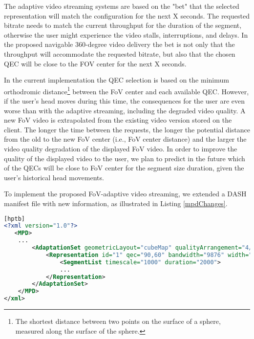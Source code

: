  The adaptive video streaming systems are based on the "bet" that the selected representation will match the configuration for the next X seconds. The requested bitrate needs to match the current throughput for the duration of the segment, otherwise the user might experience the video stalls, interruptions, and delays. In the proposed navigable 360-degree video delivery the bet is not only that the throughput will accommodate the requested bitrate, but also that the chosen QEC will be close to the FOV center for the next X seconds.

 In the current implementation the QEC selection is based on the minimum orthodromic distance\footnote{The shortest distance between two points on the surface of a sphere, measured along the surface of the sphere.} between the FoV center and each available QEC. However, if the user's head moves during this time, the consequences for the user are even worse than with the adaptive streaming, including the degraded video quality. A new FoV video is extrapolated from the existing video version stored on the client. The longer the time between the requests, the longer the potential distance from the old to the new FoV center (i.e., FoV center distance) and the larger the video quality degradation of the displayed FoV video. In order to improve the quality of the displayed video to the user, we plan to predict in the future which of the QECs will be close to FoV center for the segment size duration, given the user's historical head movements.




 To implement the proposed FoV-adaptive video streaming, we extended a DASH manifest file with new information, as illustrated in Listing \ref{mpdChanges}.
\begin{lstlisting}[language=xml, frame=single, backgroundcolor=\color{white}, caption=Extensions of MPD file, label=mpdChanges][hptb]
<?xml version="1.0"?>
   <MPD>
    ...
        <AdaptationSet geometricLayout="cubeMap" qualityArrangement="4/1/1">
            <Representation id="1" qec="90,60" bandwidth="9876" width="1920" height="1080" frameRate="30">
                <SegmentList timescale="1000" duration="2000">
                ...
            </Representation>
        </AdaptationSet>
    </MPD>
</xml>
\end{lstlisting}

